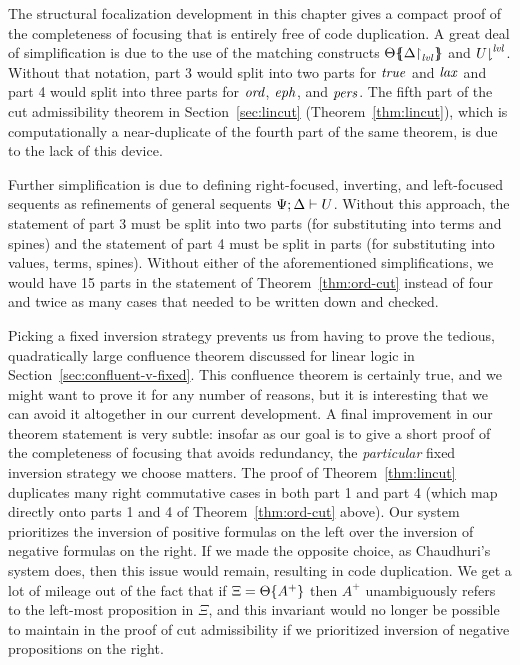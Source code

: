 The structural focalization development in this chapter gives a
compact proof of the completeness of focusing that is entirely free of
code duplication. 
A great deal of simplification is due to
the use of the matching constructs
${\Theta}\mbox{$\{\hspace{-4pt}\{$}{\ensuremath{{\Delta}{\upharpoonright}_{{\it lvl}}}}\mbox{$\}\hspace{-4pt}\}$}$ and
${U}{\downharpoonright}^{{\it lvl}}$. Without that notation, part 3 would split
into two parts for ${\it true}$ and ${\it lax}$ and part 4 would split into
three parts for ${\it ord}$, ${\it eph}$, and ${\it pers}$. The fifth part of the
cut admissibility theorem in Section~\ref{sec:lincut}
(Theorem~\ref{thm:lincut}), which is computationally a near-duplicate
of the fourth part of the same theorem, is due to the lack of this
device.

Further simplification is due to defining right-focused, inverting,
and left-focused sequents as refinements of general sequents
${\Psi};{\Delta} \vdash {U} \mathstrut$. Without this approach, the
statement of part 3 must be split into two parts (for substituting into
terms and spines) and the statement of part 4 must be split in parts (for
substituting into values, terms, spines). %
Without either of the aforementioned simplifications, we would have 15
parts in the statement of Theorem~\ref{thm:ord-cut} instead of four
and twice as many cases that needed to be
written down and checked.

Picking a fixed inversion strategy prevents us from having to prove
the tedious, quadratically large confluence theorem discussed for linear
logic in Section~\ref{sec:confluent-v-fixed}. %
This confluence theorem is certainly true, and we might want to
prove it for any number of reasons, but it is interesting that we can
avoid it altogether in our current development.  A final improvement
in our theorem statement is very subtle: insofar as our goal is to
give a short proof of the completeness of focusing that avoids
redundancy, the {\it particular} fixed inversion strategy we choose
matters. The proof of Theorem~\ref{thm:lincut} duplicates many right
commutative cases in both part 1 and part 4 (which map directly onto
parts 1 and 4 of Theorem~\ref{thm:ord-cut} above). Our system
prioritizes the inversion of positive formulas on the left over the
inversion of negative formulas on the right. If we made the opposite
choice, as Chaudhuri's system does, then this issue would remain,
resulting in code duplication.  We get a lot of mileage out of the
fact that if $\Xi = {\Theta}\{{A^+}\}$ then $A^+$ unambiguously
refers to the left-most proposition in $\Xi$, and this invariant would
no longer be possible to maintain in the proof of cut admissibility if
we prioritized inversion of negative propositions on the right.


